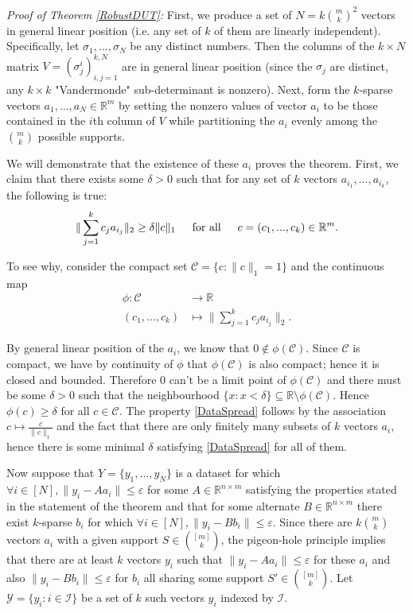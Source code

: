\documentclass[journal,onecolumn]{IEEEtran}
\begin{document}
\emph{Proof of Theorem \ref{RobustDUT}:} First, we produce a set of $N = k{m \choose k}^2$ vectors in general linear position (i.e. any set of $k$ of them are linearly independent). Specifically, let $\sigma_1, ..., \sigma_N$ be any distinct numbers. Then the columns of the $k \times N$ matrix $V = (\sigma^i_j)^{k,N}_{i,j=1}$ are in general linear position (since the $\sigma_j$ are distinct, any $k \times k$ "Vandermonde" sub-determinant is nonzero). Next, form the $k$-sparse vectors $a_1, ..., a_N \in \mathbb{R}^m$ by setting the nonzero values of vector $a_i$ to be those contained in the $i$th column of $V$ while partitioning the $a_i$ evenly among the ${m \choose k}$ possible supports.

We will demonstrate that the existence of these $a_i$ proves the theorem. First, we claim that there exists some $\delta > 0$ such that for any set of $k$ vectors $a_{i_1}, ..., a_{i_k}$, the following is true:
\begin{align}\label{DataSpread}
\|\sum_{j = 1}^k c_j a_{i_j}\|_2 \geq \delta \|c\|_1 \indent \text{for all} \indent c = (c_1, ..., c_k) \in \mathbb{R}^m.
\end{align}

To see why, consider the compact set $\mathcal{C} = \{c: \|c\|_1 = 1\}$ and the continuous map
\begin{align*}
\phi: \mathcal{C} &\to \mathbb{R} \\
(c_1, ..., c_k) &\mapsto \|\sum_{j = 1}^k c_j a_{i_j}\|_2.
\end{align*}

By general linear position of the $a_i$, we know that $0 \notin \phi(\mathcal{C})$. Since $\mathcal{C}$ is compact, we have by continuity of $\phi$ that $\phi(\mathcal{C})$ is also compact; hence it is closed and bounded. Therefore $0$ can't be a limit point of $\phi(\mathcal{C})$ and there must be some $\delta > 0$ such that the neighbourhood $\{x: x < \delta\} \subseteq \mathbb{R} \setminus \phi(\mathcal{C})$. Hence $\phi(c) \geq \delta$ for all $c \in \mathcal{C}$. The property \eqref{DataSpread} follows by the association $c \mapsto \frac{c}{\|c\|_1}$ and the fact that there are only finitely many subsets of $k$ vectors $a_i$, hence there is some minimal $\delta$ satisfying \eqref{DataSpread} for all of them.

Now suppose that $Y = \{y_1, ..., y_N\}$ is a dataset for which $\forall i \in [N], \|y_i - Aa_i\| \leq \varepsilon$ for some $A \in \mathbb{R}^{n \times m}$ satisfying the properties stated in the statement of the theorem and that for some alternate $B \in \mathbb{R}^{n \times m}$ there exist $k$-sparse $b_i$ for which $\forall i \in [N], \|y_i - Bb_i\| \leq \varepsilon$. Since there are $k{m \choose k}$ vectors $a_i$ with a given support $S \in {[m] \choose k}$, the pigeon-hole principle implies that there are at least $k$ vectors $y_i$ such that $\|y_i - Aa_i\| \leq \varepsilon$ for these $a_i$ and also $\|y_i - Bb_i\| \leq \varepsilon$ for $b_i$ all sharing some support $S' \in {[m] \choose k}$. Let $\mathcal{Y} = \{y_i: i \in \mathcal{I}\}$ be a set of $k$ such vectors $y_i$ indexed by $\mathcal{I}$. 
\end{document}
